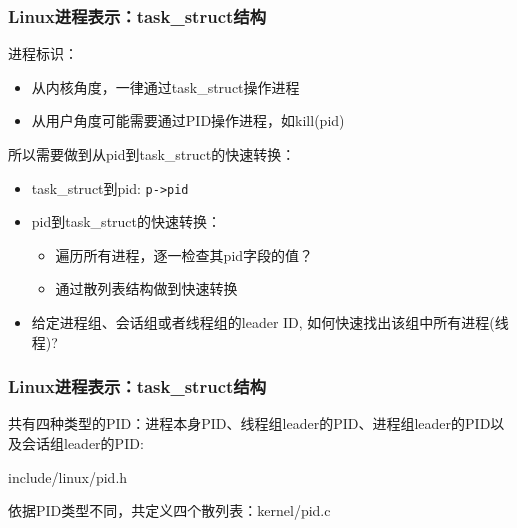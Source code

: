 \documentclass[xcolor=svgnames]{beamer}
\begin{document}
\begin{CJK*}{UTF8}{gbsn}
\begin{frame}[fragile]
\frametitle{Linux进程表示：task\_struct结构}
进程标识：

\begin{itemize}
\item 从内核角度，一律通过task\_struct操作进程
\item 从用户角度可能需要通过PID操作进程，如kill(pid)
\end{itemize}

所以需要做到从pid到task\_struct的快速转换：

\begin{itemize}
\item task\_struct到pid: \verb|p->pid|
\item pid到task\_struct的快速转换：
\begin{itemize}
\item 遍历所有进程，逐一检查其pid字段的值？
\item 通过散列表结构做到快速转换
\end{itemize}
\item 给定进程组、会话组或者线程组的leader ID, 如何快速找出该组中所有进程(线程)?
\end{itemize}

\end{frame}

\begin{frame}[fragile]
\frametitle{Linux进程表示：task\_struct结构}
共有四种类型的PID：进程本身PID、线程组leader的PID、进程组leader的PID以及会话组leader的PID:
\begin{block}{include/linux/pid.h}
\lstpidtype
\end{block}
\begin{block}{依据PID类型不同，共定义四个散列表：kernel/pid.c}
\lstpidhashhaha
\end{block}
\end{frame}


\end{CJK*}
\end{document}
